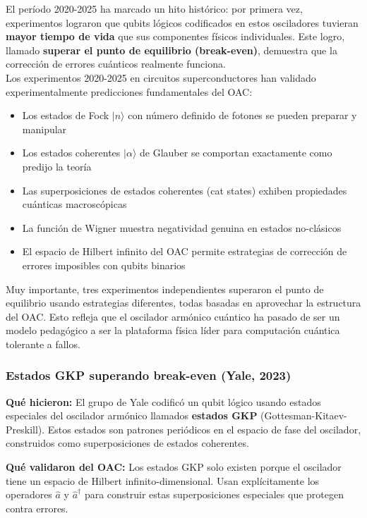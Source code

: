 \documentclass[11pt,a4paper,spanish]{book}
\begin{document}
El período 2020-2025 ha marcado un hito histórico: por primera vez, experimentos lograron que qubits lógicos codificados en estos osciladores tuvieran \textbf{mayor tiempo de vida} que sus componentes físicos individuales. Este logro, llamado \textbf{superar el punto de equilibrio (break-even)}, demuestra que la corrección de errores cuánticos realmente funciona.\\

Los experimentos 2020-2025 en circuitos superconductores han validado experimentalmente predicciones fundamentales del OAC:

\begin{itemize}
	\item Los estados de Fock $|n\rangle$ con número definido de fotones se pueden preparar y manipular
	\item Los estados coherentes $|\alpha\rangle$ de Glauber se comportan exactamente como predijo la teoría
	\item Las superposiciones de estados coherentes (cat states) exhiben propiedades cuánticas macroscópicas
	\item La función de Wigner muestra negatividad genuina en estados no-clásicos
	\item El espacio de Hilbert infinito del OAC permite estrategias de corrección de errores imposibles con qubits binarios
\end{itemize}

Muy importante, tres experimentos independientes \citep{sivak2023, ni2023, reglade2024} superaron el punto de equilibrio usando estrategias diferentes, todas basadas en aprovechar la estructura del OAC. Esto refleja que el oscilador armónico cuántico ha pasado de ser un modelo pedagógico a ser la plataforma física líder para computación cuántica tolerante a fallos.

\subsubsection{Estados GKP superando break-even (Yale, 2023)} 

\textbf{Qué hicieron:} El grupo de Yale \citep{sivak2023} codificó un qubit lógico usando estados especiales del oscilador armónico llamados \textbf{estados GKP} (Gottesman-Kitaev-Preskill). Estos estados son patrones periódicos en el espacio de fase del oscilador, construidos como superposiciones de estados coherentes.

\textbf{Qué validaron del OAC:} Los estados GKP solo existen porque el oscilador tiene un espacio de Hilbert infinito-dimensional. Usan explícitamente los operadores $\hat{a}$ y $\hat{a}^\dagger$ para construir estas superposiciones especiales que protegen contra errores.
\end{document}
